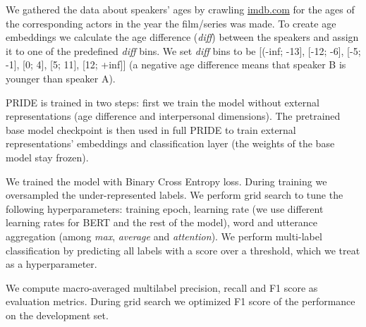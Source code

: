 We gathered the data about speakers' ages by crawling \url{imdb.com} for the ages of the corresponding actors in the year the film/series was made. To create age embeddings we calculate the age difference (\emph{diff}) between the speakers and assign it to one of the predefined \emph{diff} bins. We set \emph{diff} bins to be [(-inf; -13], [-12; -6], [-5; -1], [0; 4], [5; 11], [12; +inf]] (a negative age difference means that speaker B is younger than speaker A).

 PRIDE is trained in two steps: first we train the model without external representations (age difference and interpersonal dimensions). The pretrained base model checkpoint is then used in full PRIDE to train external representations' embeddings and classification layer (the weights of the base model stay frozen).

We trained the model with Binary Cross Entropy loss. During training we oversampled the under-represented labels. We perform grid search to tune the following hyperparameters: training epoch, learning rate (we use different learning rates for BERT and the rest of the model), word and utterance aggregation (among \textit{max}, \textit{average} and \textit{attention}).
We perform multi-label classification by predicting all labels with a score over a threshold, which we treat as a hyperparameter.

 We compute macro-averaged multilabel precision, recall and F1 score as evaluation metrics. During grid search we optimized F1 score of the performance on the development set.

